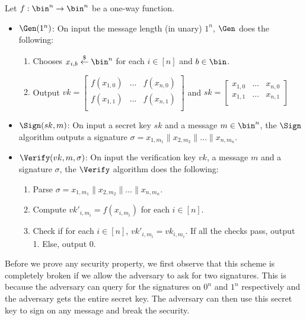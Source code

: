 Let $f: \bin^n \rightarrow \bin^n$ be a one-way function.
\begin{itemize}
\item $\Gen(1^n)$: On input the message length (in unary) $1^n$, $\Gen$ does the following:
\begin{enumerate}
    \item Chooses $x_{i,b} \overset{\$}{\gets} \bin^n$ for each $i \in [n]$ and $b \in \bin$.
    \item Output $vk = \left[ \begin{array}{ccc}
f(x_{1,0}) & \ldots & f(x_{n,0}) \\
f(x_{1,1}) & \ldots & f(x_{n,1}) \\
\end{array} \right]$ and $sk = \left[ \begin{array}{ccc}
x_{1,0} & \ldots & x_{n,0} \\
x_{1,1} & \ldots & x_{n,1} \\
\end{array} \right]$
\end{enumerate}
\item $\Sign(sk, m)$: On input a secret key $sk$ and a message $m \in \bin^n$, the $\Sign$ algorithm outputs a signature $\sigma = x_{1,m_1}\|x_{2,m_2}\| \ldots \| x_{n,m_n}$.
\item $\Verify(vk, m, \sigma)$: On input the verification key $vk$, a message $m$ and a signature $\sigma$, the $\Verify$ algorithm does the following:
\begin{enumerate}
    \item Parse $\sigma = x_{1,m_1}\|x_{2,m_2}\| \ldots \| x_{n,m_n}$.
    \item Compute $vk'_{i,m_i} = f(x_{i,m_i})$ for each $i \in [n]$.
    \item Check if for each $i \in [n]$, $vk'_{i,m_i} = vk_{i,m_i}$. If all the checks pass, output 1. Else, output 0.
\end{enumerate}
\end{itemize}

Before we prove any security property, we first observe that this scheme is completely broken if we allow the adversary to ask for two signatures. This is because the adversary can query for the signatures on $0^n$ and $1^n$ respectively and the adversary gets the entire secret key. The adversary can then use this secret key to sign on any message and break the security. 

